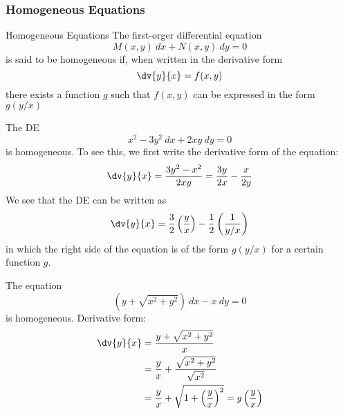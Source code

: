 \vspace{20pt}
\subsubsection{Homogeneous Equations}

\begin{definition}{Homogeneous Equations}{}
    The first-orger differential equation \[
        M(x,y) \: d{x} + N(x,y) \: d{y} = 0
    \] is said to be homogeneous if, when written in the derivative form \[
        \dv{y}{x} = f(x,y)
    \] there exists a function $g$ such that $f(x,y)$ can be expressed in the form $g(y/x)$
\end{definition}

\begin{example}{}{}
    The DE \[
        x^2 - 3y^2 \: d{x} + 2xy \: d{y} = 0
    \] is homogeneous. To see this, we first write the derivative form of the equation: \[
        \dv{y}{x} = \frac{3y^2 - x^2}{2xy} = \frac{3y}{2x} - \frac{x}{2y}
    \] We see that the DE can be written as \[
        \dv{y}{x} = \frac{3}{2} \left( \frac{y}{x} \right) - \frac{1}{2} \left( \frac{1}{y/x} \right) 
    \] in which the right side of the equation is of the form $g(y/x)$ for a certain function $g$.
\end{example}

\begin{example}{The equation \[
        (y + \sqrt{x^2 + y^2}) \: d{x} - x \: d{y} = 0
\] is homogeneous.}{}
    Derivative form:
    \begin{align*}
        \dv{y}{x} &= \frac{y + \sqrt{x^2 + y^2}}{x} \\
        &= \frac{y}{x} + \frac{\sqrt{x^2 + y^2}}{\sqrt{x^2}} \\
        &= \frac{y}{x} + \sqrt{1 + \left( \frac{y}{x} \right)^2} = g\left( \frac{y}{x} \right) \\
    \end{align*}
\end{example}

